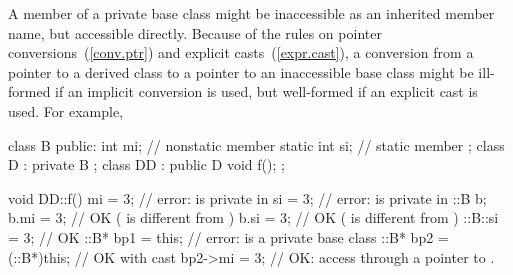\pnum
\enternote
A member of a private base class might be inaccessible as an inherited
member name, but accessible directly.
Because of the rules on pointer conversions~(\ref{conv.ptr}) and explicit casts~(\ref{expr.cast}), a conversion from a pointer to a derived class to a pointer
to an inaccessible base class might be ill-formed if an implicit conversion
is used, but well-formed if an explicit cast is used.
For example,

\begin{codeblock}
class B {
public:
	int mi;                 // nonstatic member
	static int si;          // static member
};
class D : private B {
};
class DD : public D {
	void f();
};

void DD::f() {
	mi = 3;                 // error:  is private in 
	si = 3;                 // error:  is private in 
	::B  b;
	b.mi = 3;               // OK ( is different from )
	b.si = 3;               // OK ( is different from )
	::B::si = 3;            // OK
	::B* bp1 = this;        // error:  is a private base class
	::B* bp2 = (::B*)this;  // OK with cast
	bp2->mi = 3;            // OK: access through a pointer to .
}
\end{codeblock}
\exitnoteb

